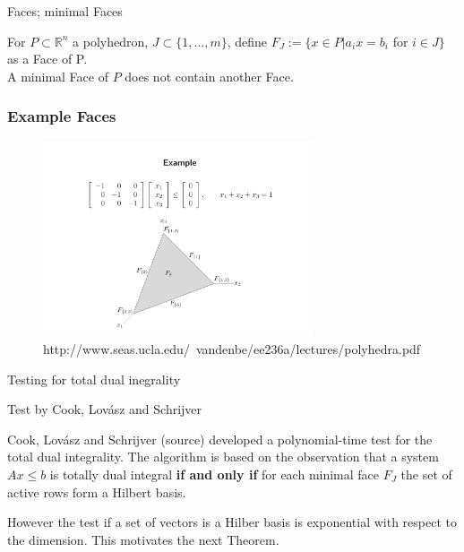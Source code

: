\documentclass{beamer}
\begin{document}
\begin{frame}

	\begin{block}{Faces; minimal Faces}

		For $P\subset \mathbb{R}^n$ a polyhedron, $J\subset \{1,\dots , m\}$, define $F_J := \{x \in P | a_i x = b_i$ for $i \in J\}$ as a Face of P.\\
		A minimal Face of $P$ does not contain another Face.

	\end{block}

\end{frame}

\begin{frame}
	\frametitle{Example Faces}
	
	\begin{figure}[htp]
		\centering
		\includegraphics[width=8cm]{images/faces_example.png}
		\caption{http://www.seas.ucla.edu/~vandenbe/ee236a/lectures/polyhedra.pdf}
		\label{fig:faces_example}
	\end{figure}
\end{frame}

\begin{frame}{Testing for total dual inegrality}

	\begin{block}{Test by Cook, Lovász and Schrijver} 

		Cook, Lovász and Schrijver (source) developed a polynomial-time test for the total dual integrality. The algorithm is based on the observation that a system $Ax\leq b$ is totally dual integral \textbf{if and only if} for each minimal face $F_J$ the set of active rows form a Hilbert basis. 
		\parskip=15pt
		
		However the test if a set of vectors is a Hilber basis is exponential with respect to the dimension. This motivates the next Theorem.

	\end{block}
		
\end{frame}
\end{document}
